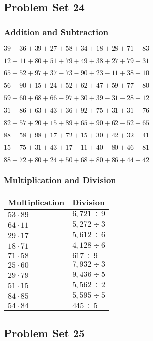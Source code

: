 \hypertarget{problem-set-24-1}{%
\subsection{Problem Set 24}\label{problem-set-24-1}}

\hypertarget{addition-and-subtraction-64}{%
\subsubsection{Addition and
Subtraction}\label{addition-and-subtraction-64}}

\(39+36+39+27+58+34+18+28+71+ 83\)

\(12+11+80+51+79+49+38+27+79+31\)

\(65+52+97+37-73-90+23-11+38+10\)

\(56+90+15+24+52+62+47+59+77+80\)

\(59+60+68+66-97+30+39-31-28+12\)

\(31+86+63+43+36+92+75+31+31+76\)

\(82-57+20+15+89+65+90+62-52-65\)

\(88+58+98+17+72+15+30+42+32+41\)

\(15+75+31+43+17-11+40-80+46-81\)

\(88+72+80+24+50+68+80+86+44+42\)

\hypertarget{multiplication-and-division-64}{%
\subsubsection{Multiplication and
Division}\label{multiplication-and-division-64}}

\begin{longtable}[]{@{}ll@{}}
\toprule
Multiplication & Division\tabularnewline
\midrule
\endhead
\(53\cdot89\) & \(6,721÷9\)\tabularnewline
\(64\cdot11\) & \(5,272÷3\)\tabularnewline
\(29\cdot17\) & \(5,612÷6\)\tabularnewline
\(18\cdot71\) & \(4,128÷6\)\tabularnewline
\(71\cdot58\) & \(617÷9\)\tabularnewline
\(25\cdot60\) & \(7,932÷3\)\tabularnewline
\(29\cdot79\) & \(9,436÷5\)\tabularnewline
\(51\cdot15\) & \(5,562÷2\)\tabularnewline
\(84\cdot85\) & \(5,595÷5\)\tabularnewline
\(54\cdot84\) & \(445÷5\)\tabularnewline
\bottomrule
\end{longtable}

\hypertarget{problem-set-25-1}{%
\subsection{Problem Set 25}\label{problem-set-25-1}}


